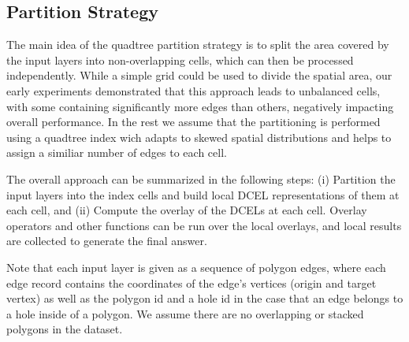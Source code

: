 \subsection{Partition Strategy} \label{sec:pstrategies}
The main idea of the quadtree partition strategy is to split the area covered by the input layers into non-overlapping cells, which can then be processed independently.  While a simple grid could be used to divide the spatial area, our early experiments demonstrated that this approach leads to unbalanced cells, with some containing significantly more edges than others, negatively impacting overall performance.  In the rest we assume that the partitioning is performed using a quadtree index wich adapts to skewed spatial distributions and helps to assign a similiar number of edges to each cell.





The overall approach can be summarized in the following steps: (i) Partition the input layers into the index cells and build local DCEL representations of them at each cell, and (ii) Compute the overlay of the DCELs at each cell. Overlay operators and other functions can be run over the local overlays, and local results are collected to generate the final answer.

Note that each input layer is given as a sequence of polygon edges, where each edge record contains the coordinates of the edge's vertices (origin and target vertex) as well as the polygon id and a hole id in the case that an edge belongs to a hole inside of a polygon. We assume there are no overlapping or stacked polygons in the dataset.

